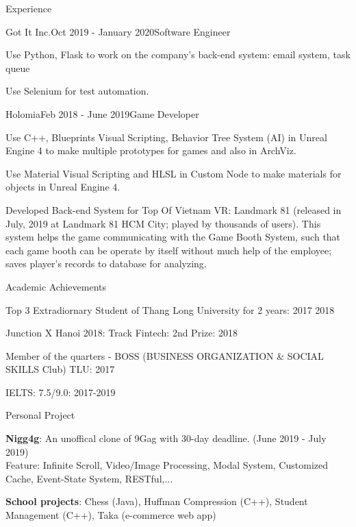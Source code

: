 \documentclass{resume} %
\begin{document}
\begin{rSection}{Experience}

\begin{rSubsection}{Got It Inc.}{Oct 2019 - January 2020}{Software Engineer}{}
  \item Use Python, Flask to work on the company's back-end system: email system, task queue
  \item Use Selenium for test automation.
  \end{rSubsection}
    
\begin{rSubsection}{Holomia}{Feb 2018 - June 2019}{Game Developer}{}
\item Use C++, Blueprints Visual Scripting, Behavior Tree System (AI) in Unreal Engine 4 to make multiple prototypes for games and also in ArchViz.
\item Use Material Visual Scripting and HLSL in Custom Node to make materials for objects in Unreal Engine 4.
\item Developed Back-end System for Top Of Vietnam VR: Landmark 81 (released in July, 2019 at Landmark 81 HCM City; played by thousands of users). This system helps the game communicating with the Game Booth System, such that each game booth can be operate by itself without much help of the employee; saves player's records to database for analyzing.
\end{rSubsection}

\end{rSection}



\begin{rSection}{Academic Achievements} \itemsep -2pt
\item Top 3 Extradiornary Student of Thang Long University for 2 years: 2017 2018 
\item Junction X Hanoi 2018: Track Fintech: 2nd Prize: 2018
\item Member of the quarters - BOSS (BUSINESS ORGANIZATION \& SOCIAL SKILLS Club) TLU: 2017
\item IELTS: 7.5/9.0: 2017-2019
\end{rSection}

\begin{rSection}{Personal Project}

\item  \textbf{Nigg4g}: An unoffical clone of 9Gag with 30-day deadline. (June 2019 - July 2019)
\\Feature: Infinite Scroll, Video/Image Processing, Modal System, Customized Cache, Event-State System, RESTful,...
\item  \textbf{School projects}: Chess (Java), Huffman Compression (C++), Student Management (C++), Taka (e-commerce web app)

\end{rSection}
\end{document}
